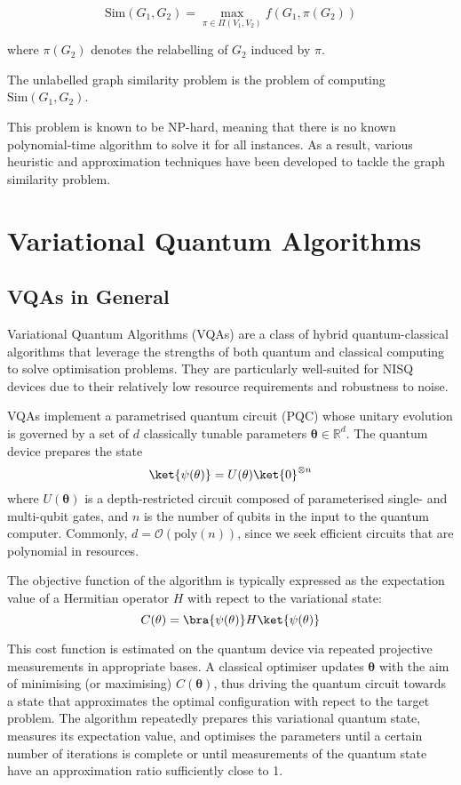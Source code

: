 $$\text{Sim}(G_1,G_2)= \max_{\pi\in\Pi(V_1,V_2)} f(G_1, \pi(G_2))$$

where $\pi(G_2)$ denotes the relabelling of $G_2$ induced by $\pi$.

The unlabelled graph similarity problem is the problem of computing $\text{Sim}(G_1,G_2)$.

This problem is known to be NP-hard, meaning that there is no known polynomial-time algorithm to solve it for all instances. As a result, various heuristic and approximation techniques have been developed to tackle the graph similarity problem.

\section{Variational Quantum Algorithms}
\subsection{VQAs in General}
Variational Quantum Algorithms (VQAs) are a class of hybrid quantum-classical algorithms that leverage the strengths of both quantum and classical computing to solve optimisation problems. They are particularly well-suited for NISQ devices due to their relatively low resource requirements and robustness to noise.

VQAs implement a parametrised quantum circuit (PQC) whose unitary evolution is governed by a set of $d$ classically tunable parameters $\mathbf{\theta}\in\mathbb{R}^d$. The quantum device prepares the state
$$\ket{\psi(\mathbf{\theta})}=U(\mathbf{\theta})\ket{0}^{\otimes n}$$
where $U(\mathbf{\theta})$ is a depth-restricted circuit composed of parameterised single- and multi-qubit gates, and $n$ is the number of qubits in the input to the quantum computer. Commonly, $d=\mathcal{O}(\text{poly}(n))$, since we seek efficient circuits that are polynomial in resources. 

The objective function of the algorithm is typically expressed as the expectation value of a Hermitian operator $H$ with repect to the variational state:
$$C(\mathbf{\theta})= \bra{\psi(\mathbf{\theta})}H\ket{\psi(\mathbf{\theta})} $$

This cost function is estimated on the quantum device via repeated projective measurements in appropriate bases. A classical optimiser updates $\mathbf{\theta}$ with the aim of minimising (or maximising) $C(\mathbf{\theta})$, thus driving the quantum circuit towards a state that approximates the optimal configuration with repect to the target problem. The algorithm repeatedly prepares this variational quantum state, measures its expectation value, and optimises the parameters until a certain number of iterations is complete or until measurements of the quantum state have an approximation ratio sufficiently close to 1.

